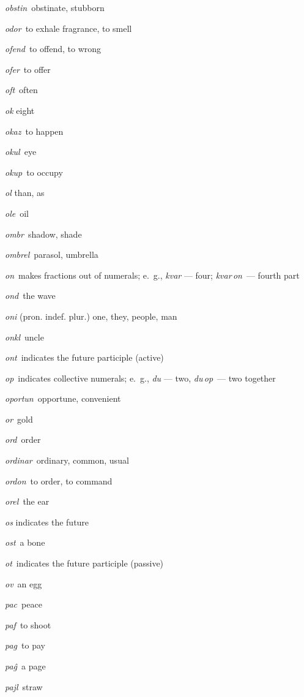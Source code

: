 \begin{landscape}
\begin{multicols}{5}
\begin{outdent}{1em}
\emph{obstin\,} obstinate, stubborn

\emph{odor\,} to exhale fragrance, to smell

\emph{ofend\,} to offend, to wrong

\emph{ofer\,} to offer

\emph{oft\,} often

\emph{ok} eight

\emph{okaz\,} to happen

\emph{okul\,} eye

\emph{okup\,} to occupy

\emph{ol} than, as

\emph{ole\,} oil

\emph{ombr\,} shadow, shade

\emph{ombrel\,} parasol, umbrella

\emph{on\,} makes fractions out of numerals; e.~g., \emph{kvar} — four; \emph{kvar\,on\,} — fourth part

\emph{ond\,} the wave

\emph{oni} (pron. indef. plur.) one, they, people, man

\emph{onkl\,} uncle

\emph{ont\,} indicates the future participle (active)

\emph{op\,} indicates collective numerals; e.~g., \emph{du} — two, \emph{du\,op\,} — two together

\emph{oportun\,} opportune, convenient

\emph{or\,} gold

\emph{ord\,} order

\emph{ordinar\,} ordinary, common, usual

\emph{ordon\,} to order, to command

\emph{orel\,} the ear

\emph{os} indicates the future

\emph{ost\,} a bone

\emph{ot\,} indicates the future participle (passive)

\emph{ov\,} an egg
\end{outdent}


\begin{outdent}{1em}
\emph{pac\,} peace

\emph{paf\,} to shoot

\emph{pag\,} to pay

\emph{paĝ\,} a page

\emph{pajl\,} straw


\end{outdent}
\end{multicols}
\end{landscape}
